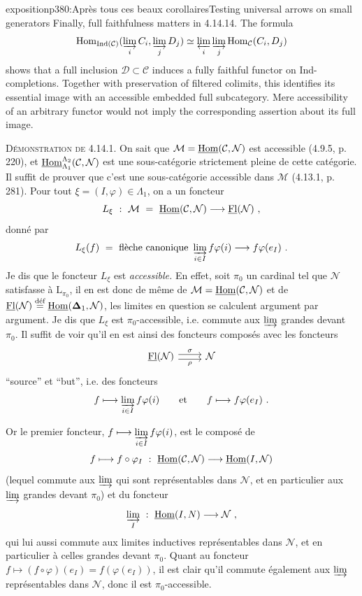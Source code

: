 \begin{dcomment}{exposition}{p380:Après tous ces beaux corollaires}{Testing universal arrows on small generators}
Finally, full faithfulness matters in 4.14.14. The formula
\[
 \Hom_{\operatorname{Ind}(\mathcal C)}
    (\varinjlim_iC_i,\varinjlim_jD_j)
 \simeq\varprojlim_i\varinjlim_j\Hom_{\mathcal C}(C_i,D_j)
\]
shows that a full inclusion $\mathcal D\subset\mathcal C$ induces a fully faithful functor on Ind-completions. Together with preservation of filtered colimits, this identifies its essential image with an accessible embedded full subcategory. Mere accessibility of an arbitrary functor would not imply the corresponding assertion about its full image.
\end{dcomment}


\textsc{Démonstration de} 4.14.1. On sait que $\mathcal{M} = \uHom(\mathcal{C},\mathcal{N})$ est accessible (4.9.5, p. 220), et $\uHom^{\Lambda_2}_{\Lambda_1}(\mathcal{C},\mathcal{N})$ est une sous-catégorie strictement pleine de cette catégorie. Il suffit de prouver que c'est une sous-catégorie accessible dans $\mathcal{M}$ (4.13.1, p. 281). Pour tout $\xi = (I,\varphi) \in \Lambda_1$, on a un foncteur
\[
L_\xi \ : \ \mathcal{M} \ = \ \uHom(\mathcal{C},\mathcal{N}) \longrightarrow \uFl(\mathcal{N}) \ ,
\]
donné par
\[
L_\xi(f) \ = \ \text{flèche canonique } \varinjlim_{i\in I} f\varphi(i) \longrightarrow f\varphi(e_I) \ .
\]
Je dis que le foncteur $L_\xi$ est \textit{accessible.} En effet, soit $\pi_0$ un cardinal tel que $\mathcal{N}$ satisfasse à $\mathrm{L}_{\pi_0}$, il en est donc de même de $\mathcal{M} = \uHom(\mathcal{C},\mathcal{N})$ et de $\uFl(\mathcal{N}) \defeq \uHom(\boldsymbol{\Delta}_1,\mathcal{N})$, les limites en question se calculent argument par argument. Je dis que $L_\xi$ est $\pi_0$-accessible, i.e. commute aux $\varinjlim$ grandes devant $\pi_0$. Il suffit de voir qu'il en est ainsi des foncteurs composés avec les foncteurs
\[
\begin{tikzcd}
\uFl(\mathcal{N}) \arrow[r, shift left, "\sigma"] \arrow[r, shift right, "\rho"'] & \mathcal{N}
\end{tikzcd}
\]
``source'' et ``but'', i.e. des foncteurs
\[
f \longmapsto \varinjlim_{i\in I} f\varphi(i) \qquad \text{et} \qquad f \longmapsto f\varphi(e_I) \ .
\]

Or le premier foncteur, $f \longmapsto \varinjlim\limits_{i\in I} f\varphi(i)$, est le composé de
\[
f \longmapsto f\circ\varphi_I \ : \ \uHom(\mathcal{C},\mathcal{N}) \longrightarrow \uHom(I,\mathcal{N})
\]
(lequel commute aux $\varinjlim$ qui sont représentables dans $\mathcal{N}$, et en particulier aux $\varinjlim$ grandes devant $\pi_0$) et du foncteur
\[
\varinjlim_{I} \ : \ \uHom(I,N) \longrightarrow \mathcal{N} \ , %
\]
qui lui aussi commute aux limites inductives représentables dans $\mathcal{N}$, et en particulier à celles grandes devant $\pi_0$. Quant au foncteur $f \longmapsto (f\circ\varphi)(e_I) = f(\varphi(e_I))$, il est clair qu'il commute également aux $\varinjlim$ représentables dans $\mathcal{N}$, donc il est $\pi_0$-accessible.

